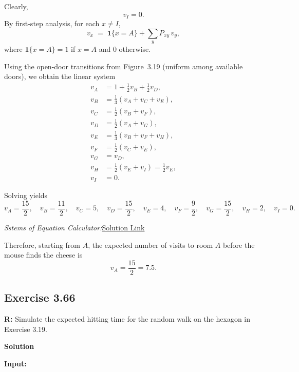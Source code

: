 \documentclass[hidelinks]{article}
\begin{document}
\noindent Clearly,
\[
v_I=0.
\]
By first-step analysis, for each $x\neq I$,
\[
v_x \;=\; \mathbf{1}\{x=A\} + \sum_y P_{xy}\,v_y,
\]
where $\mathbf{1}\{x=A\}=1$ if $x=A$ and $0$ otherwise.

\noindent Using the open-door transitions from Figure~3.19 (uniform among available doors),
we obtain the linear system
\begin{align*}
v_A &= 1 + \tfrac12 v_B + \tfrac12 v_D,\\
v_B &= \tfrac13(v_A+v_C+v_E),\\
v_C &= \tfrac12(v_B+v_F),\\
v_D &= \tfrac12(v_A+v_G),\\
v_E &= \tfrac13(v_B+v_F+v_H),\\
v_F &= \tfrac12(v_C+v_E),\\
v_G &= v_D,\\
v_H &= \tfrac12(v_E+v_I)=\tfrac12 v_E,\\
v_I &= 0.
\end{align*}

\noindent Solving yields
\[
v_A=\frac{15}{2},\quad
v_B=\frac{11}{2},\quad
v_C=5,\quad
v_D=\frac{15}{2},\quad
v_E=4,\quad
v_F=\frac{9}{2},\quad
v_G=\frac{15}{2},\quad
v_H=2,\quad
v_I=0.
\]

\textit{Sstems of Equation Calculator:}\href{https://matrixcalc.org/slu.html#solve-using-Gaussian-elimination%28%7B%7B-1,1/2,0,1/2,0,0,0,0,0,-1%7D,%7B1/3,-1,1/3,0,1/3,0,0,0,0,0%7D,%7B0,1/2,-1,0,0,1/2,0,0,0,0%7D,%7B1/2,0,0,-1,0,0,1/2,0,0,0%7D,%7B0,1/3,0,0,-1,1/3,0,1/3,0,0%7D,%7B0,0,1/2,0,1/2,-1,0,0,0,0%7D,%7B0,0,0,1,0,0,-1,0,0,0%7D,%7B0,0,0,0,1/2,0,0,-1,1/2,0%7D,%7B0,0,0,0,0,0,0,0,-1,0%7D%7D%29}{Solution Link}

Therefore, starting from $A$, the expected number of visits to room $A$ before the
mouse finds the cheese is
\[
\boxed{v_A=\frac{15}{2}=7.5.}
\]

\subsection{Exercise 3.66}

\textbf{R:} Simulate the expected hitting time for the random walk on the hexagon in Exercise 3.19.

\smallskip

\noindent \textbf{Solution}

\noindent \textbf{Input:}
\end{document}
